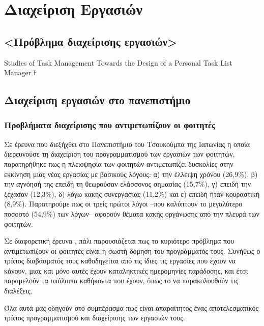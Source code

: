 \chapter{Διαχείριση Εργασιών}

    \section{<Πρόβλημα διαχείρισης εργασιών>}
        Studies of Task Management Towards the Design of a Personal Task List Manager
f
    \section{Διαχείριση εργασιών στο πανεπιστήμιο}
        \subsection{Προβλήματα διαχείρισης που αντιμετωπίζουν οι φοιτητές}
            Σε έρευνα \cite{Fukuzawa2015} που διεξήχθει στο Πανεπιστήμιο του Τσουκούμπα της Ιαπωνίας η οποία διερευνούσε τη διαχείριση του προγραμματισμού των εργασιών των φοιτητών,
                παρατηρήθηκε πως η πλειοψηφία των φοιτητών αντιμετωπίζει δυσκολίες στην εκκίνηση μιας νέας εργασίας με βασικούς λόγους:
                α) την έλλειψη χρόνου (26,9\%), β) την αγνόησή της επειδή τη θεωρούσαν ελάσσονος σημασίας (15,7\%), γ) επειδή την ξέχασαν (12,3\%),
                δ) λόγω κακής συνεργασίας (11,2\%) και ε) επειδή ήταν κουραστική (8,9\%).
            Παρατηρούμε πως οι τρείς πρώτοι λόγοι --που καλύπτουν το μεγαλύτερο ποσοστό (54,9\%) των λόγων-- αφορούν θέματα κακής οργάνωσης από την πλευρά των φοιτητών.

            Σε διαφορετική έρευνα \cite{Trujillo2020}, πάλι παρουσιάζεται πως το κυριότερο πρόβλημα που αντιμετωπίζουν οι φοιτητές είναι η σωστή δόμηση του προγράμματός τους.
            Συνήθως ο τρόπος διαβάσματός τους καθοδηγείται από τις ίδιες τις εργασίες που έχουν να κάνουν, μιας και μόνο αυτές έχουν καταληκτικές ημερομηνίες παράδοσης,
                και έτσι παραμελούν τα υπόλοιπα καθήκοντα που έχουν, όπως το να παρακολουθούν τις διαλέξεις.

            Όλα αυτά μας οδηγούν στο συμπέρασμα πως είναι απαραίτητος ένας αποτελεσματικός τρόπος προγραμματισμού και διαχείρισης των εργασιών τους.

